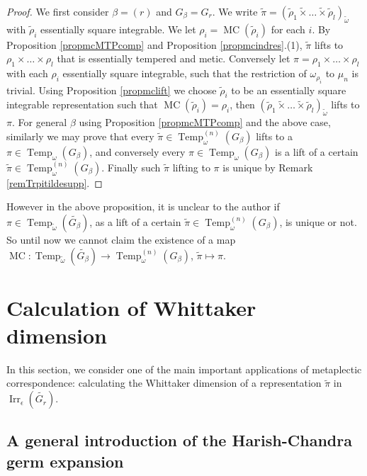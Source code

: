 \documentclass{amsart}
\numberwithin{equation}{section}
\newcommand{\mrirr}{\operatorname{Irr}}
\newcommand{\mrtemp}{\operatorname{Temp}}
\newcommand{\mrmc}{\operatorname{MC}}
\newcommand{\wt}[1]{\widetilde{#1}}
\begin{document}
	\begin{proof}
		
		We first consider $\beta=(r)$ and $G_{\beta}=G_{r}$. We write $\wt{\pi}=(\wt{\rho}_{1}\wt{\times}\dots\wt{\times}\wt{\rho}_{l})_{\wt{\omega}}$ with $\wt{\rho}_{i}$ essentially square integrable. We let $\rho_{i}=\mrmc(\wt{\rho}_{i})$ for each $i$. By Proposition \ref{propmcMTPcomp} and Proposition \ref{propmcindres}.(1), $\wt{\pi}$ lifts to $\rho_{1}\times\dots\times\rho_{l}$ that is essentially tempered and metic. Conversely let $\pi=\rho_{1}\times\dots\times\rho_{l}$ with each $\rho_{i}$ essentially square integrable, such that the restriction of $\omega_{\rho_{i}}$ to $\mu_{n}$ is trivial. Using Proposition \ref{propmclift} we choose $\wt{\rho}_{i}$ to be an essentially square integrable representation such that $\mrmc(\wt{\rho}_{i})=\rho_{i}$, then $(\wt{\rho}_{1}\wt{\times}\dots\wt{\times}\wt{\rho}_{l})_{\wt{\omega}}$ lifts to $\pi$. For general $\beta$ using Proposition \ref{propmcMTPcomp} and the above case, similarly we may prove that every $\wt{\pi}\in\mrtemp^{(n)}_{\omega}(G_{\beta})$ lifts to a $\pi\in\mrtemp_{\omega}(G_{\beta})$, and conversely every $\pi\in\mrtemp_{\omega}(G_{\beta})$ is a lift of a certain $\wt{\pi}\in\mrtemp^{(n)}_{\omega}(G_{\beta})$. Finally such $\widetilde{\pi}$ lifting to $\pi$ is unique by Remark \ref{remTrpitildesupp}.
		
	\end{proof}
	
	However in the above proposition, it is unclear to the author if  $\pi\in\mrtemp_{\wt{\omega}}(\wt{G_{\beta}})$, as a lift of a certain $\wt{\pi}\in\mrtemp^{(n)}_{\omega}(G_{\beta})$, is unique or not. So until now we cannot claim the existence of a map
	$\mrmc:\mrtemp_{\wt{\omega}}(\wt{G_{\beta}})\rightarrow\mrtemp_{\omega}^{(n)}(G_{\beta})$, $\wt{\pi}\mapsto\pi.$
	
	\section{Calculation of Whittaker dimension}
	
	In this section, we consider one of the main important applications of metaplectic correspondence: calculating the Whittaker dimension of a representation $\wt{\pi}$ in $\mrirr_{\epsilon}(\wt{G_{r}})$.
	
	\subsection{A general introduction of the Harish-Chandra germ expansion}\label{subsectionHCgerm}
	
\end{document}
